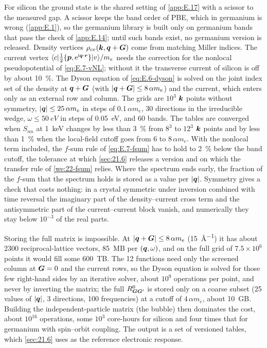 For silicon the ground state is the shared setting of \cref{app:E.17} with a scissor to the measured gap. A scissor keeps the band order of PBE, which in germanium is wrong (\cref{app:E.1}), so the germanium library is built only on germanium bands that pass the check of \cref{app:E.14}; until such bands exist, no germanium version is released. Density vertices $\rho_{cv}(\bm{k},\bm{q}+\bm{G})$ come from matching Miller indices. The current vertex $\langle c|\tfrac12\{\bm{p},\mathrm{e}^{\mathrm{i}\bm{q}\cdot\bm{r}}\}|v\rangle/m_e$ needs the correction for the nonlocal pseudopotential of \cref{eq:E.7-vNL}; without it the transverse current of silicon is off by about \SI{10}{\percent}. The Dyson equation of \cref{eq:E.6-dyson} is solved on the joint index set of the density at $\bm{q}+\bm{G}$ (with $|\bm{q}+\bm{G}| \le 8\,\alpha m_e$) and the current, which enters only as an external row and column. The grids are $10^3$ $\bm{k}$ points without symmetry, $|\bm{q}| \le 25\,\alpha m_e$ in steps of $0.1\,\alpha m_e$, 30 directions in the irreducible wedge, $\omega \le \SI{50}{eV}$ in steps of \SI{0.05}{eV}, and 60 bands. The tables are converged when $S_{nn}$ at \SI{1}{keV} changes by less than \SI{3}{\percent} from $8^3$ to $12^3$ $\bm{k}$ points and by less than \SI{1}{\percent} when the local-field cutoff goes from 6 to $8\,\alpha m_e$. With the nonlocal term included, the $f$-sum rule of \cref{eq:E.7-fsum} has to hold to \SI{2}{\percent} below the band cutoff, the tolerance at which \cref{sec:21.6} releases a version and on which the transfer rule of \cref{we:22-fsum} relies. Where the spectrum ends early, the fraction of the $f$-sum that the spectrum holds is stored as a value per $|\bm{q}|$. Symmetry gives a check that costs nothing: in a crystal symmetric under inversion combined with time reversal the imaginary part of the density--current cross term and the antisymmetric part of the current--current block vanish, and numerically they stay below $10^{-3}$ of the real parts.

Storing the full matrix is impossible. At $|\bm{q}+\bm{G}| \le 8\,\alpha m_e$ (\SI{15}{\angstrom^{-1}}) it has about 2300 reciprocal-lattice vectors, \SI{85}{MB} per $(\bm{q},\omega)$, and on the full grid of $7.5\times10^6$ points it would fill some \SI{600}{TB}. The 12 functions need only the screened column at $\bm{G} = 0$ and the current rows, so the Dyson equation is solved for those few right-hand sides by an iterative solver, about $10^9$ operations per point, and never by inverting the matrix; the full $R^0_{\bm{G}\bm{G}'}$ is stored only on a coarse subset (25 values of $|\bm{q}|$, 3 directions, 100 frequencies) at a cutoff of $4\,\alpha m_e$, about \SI{10}{GB}. Building the independent-particle matrix (the bubble) then dominates the cost, about $10^{16}$ operations, some $10^3$ core-hours for silicon and four times that for germanium with spin--orbit coupling. The output is a set of versioned tables, which \cref{sec:21.6} uses as the reference electronic response.

